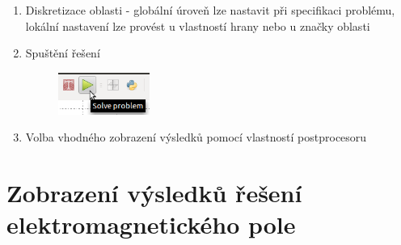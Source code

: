 \begin{enumerate}
\item Diskretizace oblasti - globální úroveň lze nastavit při specifikaci problému, lokální nastavení lze provést u vlastností hrany nebo u značky oblasti 
\item Spuštění řešení
\begin{figure}[!h]
	\centering
	\includegraphics[width=3cm]{sim_spusteni_reseni.png}
\end{figure}
\item Volba vhodného zobrazení výsledků pomocí vlastností postprocesoru
\end{enumerate}

\section{Zobrazení výsledků řešení elektromagnetického pole}


 
